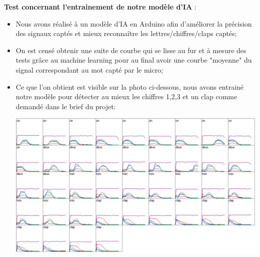 \documentclass[a4paper,11pt]{book}
\begin{document}
\noindent \textbf{Test concernant l'entrainement de notre modèle d'IA} : 
\begin{itemize}
	\item Nous avons réalisé à un modèle d'IA en Arduino afin d'améliorer la précision des signaux captés et mieux reconnaître les lettres/chiffres/claps captés;
	\item On est censé obtenir une suite de courbe qui se lisse au fur et à mesure des tests grâce au machine learning pour au final avoir une courbe "moyenne" du signal correspondant au mot capté par le micro;
	\item Ce que l’on obtient est visible sur la photo ci-dessous, nous avons entrainé notre modèle pour détecter au mieux les chiffres 1,2,3 et un clap comme demandé dans le brief du projet: 

    \includegraphics[width=\textwidth]{template_PRJ_TEX_FR/training_IAArdiuno.png} 

\end{itemize}
\end{document}
